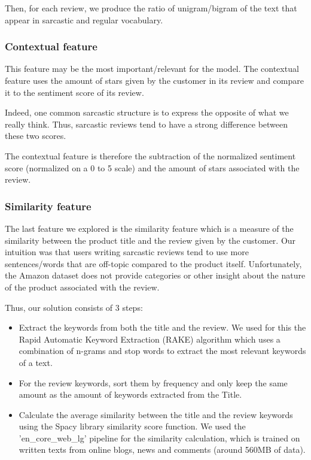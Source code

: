 \documentclass[10pt,twocolumn,letterpaper]{article}
\begin{document}
Then, for each review, we produce the ratio of unigram/bigram of the text that appear in sarcastic and regular vocabulary.

\subsubsection{Contextual feature}

This feature may be the most important/relevant for the model.
The contextual feature uses the amount of stars given by the customer in its review and compare it to the sentiment score of its review.

Indeed, one common sarcastic structure is to express the opposite of what we really think.
Thus, sarcastic reviews tend to have a strong difference between these two scores.

The contextual feature is therefore the subtraction of the normalized sentiment score (normalized on a 0 to 5 scale) and the amount of stars associated with the review.

\subsubsection{Similarity feature}

The last feature we explored is the similarity feature which is a measure of the similarity between the product title and the review given by the customer.
Our intuition was that users writing sarcastic reviews tend to use more sentences/words that are off-topic compared to the product itself.
Unfortunately, the Amazon dataset does not provide categories or other insight about the nature of the product associated with the review.

Thus, our solution consists of 3 steps:
\begin{itemize}
    \item Extract the keywords from both the title and the review. We used for this the Rapid Automatic Keyword Extraction (RAKE) algorithm which uses a combination of n-grams and stop words to extract the most relevant keywords of a text.~\cite{rake2010}
    \item For the review keywords, sort them by frequency and only keep the same amount as the amount of keywords extracted from the Title.
    \item Calculate the average similarity between the title and the review keywords using the Spacy library similarity score function. We used the 'en\_core\_web\_lg' pipeline for the similarity calculation, which is trained on written texts from online blogs, news and comments (around 560MB of data).
\end{itemize}
\end{document}
